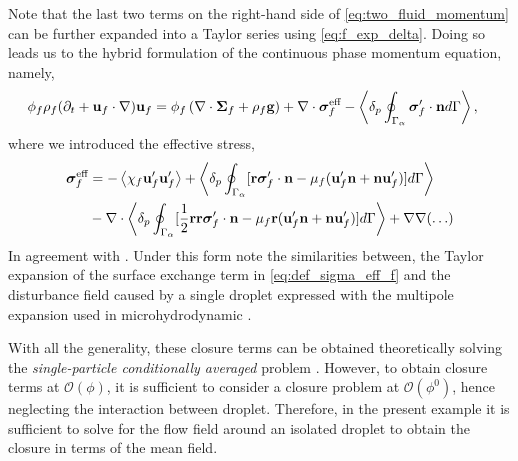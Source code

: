 Note that the last two terms on the right-hand side of \ref{eq:two_fluid_momentum} can be further expanded into a Taylor series using \ref{eq:f_exp_delta}. 
Doing so leads us to the hybrid formulation of the continuous phase momentum  equation, namely,
\begin{align}
    \phi_f \rho_f(\pddt + \textbf{u}_f  \cdot \grad) \textbf{u}_f
    &= \phi_f 
    \left(\div \bm{\Sigma}_f
    + \rho_f \textbf{g}\right)
    + \div \bm\sigma_f^\text{eff}
    - \pSavg{\bm\sigma_f'\cdot \textbf{n}}, 
    \label{eq:dt_uf}
\end{align}
where we introduced the effective stress, 
\begin{align}
    \bm{\sigma}^{\text{eff}}_f 
    &= 
    -\avg{\chi_f \textbf{u}_f'\textbf{u}_f'} 
    + \pSavg{[\textbf{r}\bm\sigma'_f\cdot \textbf{n} - \mu_f (\textbf{u}_f' \textbf{n} + \textbf{n} \textbf{u}_f')]}\\
    &- \div
        \pSavg{[\frac{1}{2}\textbf{rr}\bm\sigma'_f\cdot \textbf{n}- \mu_f\textbf{r} (\textbf{u}_f' \textbf{n} + \textbf{n} \textbf{u}_f')]}
        + \grad\grad (\ldots)
    \label{eq:def_sigma_eff_f}
\end{align}
In agreement with \citet{zhang1997momentum,jackson1997locally}.
Under this form note the similarities between, the Taylor expansion of the surface exchange term in \ref{eq:def_sigma_eff_f} and the disturbance field caused by a single droplet expressed with the multipole expansion used in microhydrodynamic \citet{pozrikidis1992boundary,kim2013microhydrodynamics}. 

With all the generality, these closure terms can be obtained theoretically solving the \textit{single-particle conditionally averaged} problem \citep{hinch1977averaged,zhang1994averaged} . 
However, to obtain closure terms at $\mathcal{O}(\phi)$, it is sufficient to consider a closure problem at $\mathcal{O}(\phi^0)$\citep{hinch1977averaged,zhang1994averaged}, hence neglecting the interaction between droplet. 
Therefore, in the present example it is sufficient to solve for the flow field around an isolated droplet to obtain the closure in terms of the mean field.


